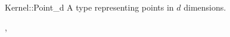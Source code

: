 \begin{ccRefConcept}{Kernel::Point_d}
A type representing points in $d$ dimensions.

\ccRefines
{},

\ccSeeAlso
{}

\end{ccRefConcept}
